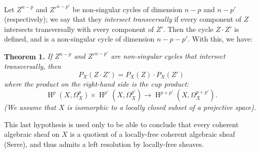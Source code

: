 \documentclass{article}
\newenvironment{itenv}[1]
  {\phantomsection\par\medskip\noindent\textbf{#1.}\itshape}
  {\medskip}
\DeclareMathOperator{\HH}{H}
\newcommand{\oldpage}[1]{\marginpar{\footnotesize$\Big\vert$ \textit{p.~#1}}}
\begin{document}
Let $Z^{n-p}$ and $Z'^{n-p'}$ be non-singular cycles of dimension $n-p$ and $n-p'$ (respectively);
we say that they \emph{intersect transversally} if every component of $Z$ intersects transversally with every component of $Z'$.
Then the cycle $Z\cdot Z'$ is defined, and is a non-singular cycle of dimension $n-p-p'$.
With this, we have:

\oldpage{149-11}
\begin{itenv}{Theorem 1}
\label{theorem1}
  If $Z^{n-p}$ and $Z'^{n-p'}$ are non-singular cycles that intersect transversally, then
  \[
  \label{4.4}
    P_X(Z\cdot Z') = P_X(Z)\cdot P_X(Z')
  \tag{4.4}
  \]
  where the product on the right-hand side is the cup product:
  \[
    \HH^p(X,\Omega_X^p)\times\HH^{p'}(X,\Omega_X^{p'}) \to \HH^{p+p'}(X,\Omega_X^{p+p'}).
  \]
  (We assume that $X$ is isomorphic to a locally closed subset of a projective space).
\end{itenv}

This last hypothesis is used only to be able to conclude that every coherent algebraic sheaf on $X$ is a quotient of a locally-free coherent algebraic sheaf (Serre), and thus admits a left resolution by locally-free sheaves.
\end{document}
